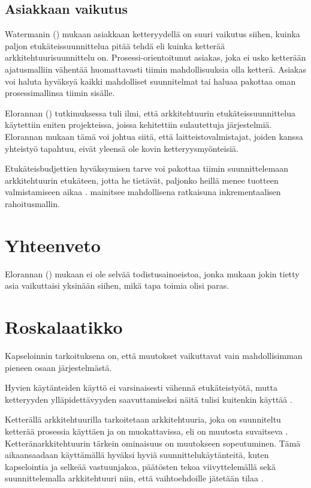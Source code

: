 \section{Asiakkaan vaikutus}
Watermanin (\citeyear{waterman_how_2015}) mukaan asiakkaan ketteryydellä on suuri vaikutus siihen, kuinka paljon etukäteissuunnittelua pitää tehdä eli kuinka ketterää arkkitehtuurisuunnittelu on. Prosessi-orientoitunut asiakas, joka ei usko ketterään ajatusmalliin vähentää huomattavasti tiimin mahdollisuuksia olla ketterä. Asiakas voi haluta hyväksyä kaikki mahdolliset suunnitelmat tai haluaa pakottaa oman prosessimallinsa tiimin sisälle. 

Elorannan (\citeyear{eloranta2015techniques}) tutkimuksessa tuli ilmi, että arkkitehtuurin etukäteissuunnittelua käytettiin eniten projekteissa, joissa kehitettiin sulautettuja järjestelmiä. Elorannan mukaan tämä voi johtua siitä, että laitteistovalmistajat, joiden kanssa yhteistyö tapahtuu, eivät yleensä ole kovin ketteryysmyönteisiä.

Etukäteisbudjettien hyväksymisen tarve voi pakottaa tiimin suunnittelemaan arkkitehtuurin etukäteen, jotta he tietävät, paljonko heillä menee tuotteen valmistamiseen aikaa \citep{waterman_how_2015}. \cite{abrahamsson2010agility} mainitsee mahdollisena ratkaisuna inkrementaalisen rahoitusmallin. 

\chapter{Yhteenveto}

Elorannan (\citeyear{eloranta2015techniques}) mukaan ei ole selvää todistusainoeistoa, jonka mukaan jokin tietty asia vaikuttaisi yksinään siihen, mikä tapa toimia olisi paras.

\iffalse
\chapter{Roskalaatikko}

Kapseloinnin tarkoituksena on, että muutokset vaikuttavat vain mahdollisimman pieneen osaan järjestelmästä. 

Hyvien käytänteiden käyttö ei varsinaisesti vähennä etukäteistyötä, mutta ketteryyden ylläpidettävyyden saavuttamiseksi näitä tulisi kuitenkin käyttää \citep{waterman_agility_2018_a}. 

Ketterällä arkkitehtuurilla tarkoitetaan arkkitehtuuria, joka on suunniteltu ketterää prosessia käyttäen ja on muokattavissa, eli on muutosta suvaitseva \citep{waterman_how_2015}. Ketteränarkkitehtuurin tärkein ominaisuus on muutokseen sopeutuminen. Tämä aikaansaadaan käyttämällä hyväksi hyviä suunnittelukäytänteitä, kuten kapselointia ja selkeää vastuunjakoa, päätösten tekoa viivyttelemällä sekä suunnittelemalla arkkitehtuuri niin, että vaihtoehdoille jätetään tilaa \citep{waterman_agility_2018_a}. 

